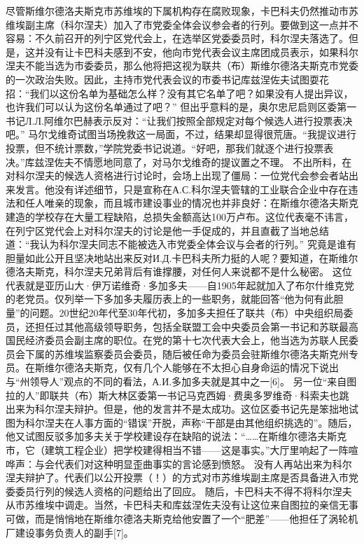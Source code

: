 尽管斯维尔德洛夫斯克市苏维埃的下属机构存在腐败现象，卡巴科夫仍然推动市苏维埃副主席（科尔涅夫）加入了市党委全体会议参会者的行列。要做到这一点并不容易：不久前召开的列宁区党代会上，在选举区党委委员时，科尔涅夫落选了。但是，这并没有让卡巴科夫感到不安，他向市党代表会议主席团成员表示，如果科尔涅夫不能当选为市委委员，那么他将把这视为联共（布）斯维尔德洛夫斯克市党委的一次政治失败。因此，主持市党代表会议的市委书记库兹涅佐夫试图耍花招：“我们以这份名单为基础怎么样？没有其它名单了吧？如果没有人提出异议，也许我们可以认为这份名单通过了吧？”
但出乎意料的是，奥尔忠尼启则区委第一书记Л.Л.阿维尔巴赫表示反对：“让我们按照全部规定对每个候选人进行投票表决吧。”
马尔戈维奇试图当场挽救这一局面，不过，结果却显得很荒唐。“我提议进行投票，但不统计票数，”学院党委书记说道。“好吧，那我们就逐个进行投票表决。”库兹涅佐夫不情愿地同意了，对马尔戈维奇的提议置之不理。
不出所料，在对科尔涅夫的候选人资格进行讨论时，会场上出现了僵局：一位党代会参会者站出来发言。他没有详述细节，只是宣称在А.С.科尔涅夫管辖的工业联合企业中存在违法和任人唯亲的现象，而且城市建设事业的情况也并非良好：在斯维尔德洛夫斯克建造的学校存在大量工程缺陷，总损失金额高达100万卢布。这位代表毫不讳言，在列宁区党代会上对科尔涅夫的讨论是他一手促成的，并且直截了当地总结道：“我认为科尔涅夫同志不能被选入市党委全体会议与会者的行列。”
究竟是谁有胆量如此公开且坚决地站出来反对И.Д.卡巴科夫所力挺的人呢？要知道，在斯维尔德洛夫斯克，科尔涅夫兄弟背后有谁撑腰，对任何人来说都不是什么秘密。
这位代表就是亚历山大·伊万诺维奇·多加多夫——自1905年起就加入了布尔什维克党的老党员。仅列举一下多加多夫履历表上的一些职务，就能回答“他为何有此胆量”的问题。20世纪20年代至30年代初，多加多夫担任了联共（布）中央组织局委员，还担任过其他高级领导职务，包括全联盟工会中央委员会第一书记和苏联最高国民经济委员会副主席的职位。在党的第十七次代表大会上，他当选为苏联人民委员会下属的苏维埃监察委员会委员，随后被任命为委员会驻斯维尔德洛夫斯克州专员。在斯维尔德洛夫斯克，仅有几个人能够在不太担心自身命运的情况下说出与“州领导人”观点的不同的看法，А.И.多加多夫就是其中之一[6]。
另一位“来自图拉的人”即联共（布）斯大林区委第一书记马克西姆·费奥多罗维奇·科索夫也跳出来为科尔涅夫辩护。但是，他的发言并不是太成功。这位区委书记先是笨拙地试图为科尔涅夫在人事方面的“错误”开脱，声称“干部是由其他组织挑选的”。随后，他又试图反驳多加多夫关于学校建设存在缺陷的说法：“……在斯维尔德洛夫斯克市，它（建筑工程企业）把学校建得相当不错——这是事实。”大厅里响起了一阵喧哗声：与会代表们对这种明显歪曲事实的言论感到愤怒。
没有人再站出来为科尔涅夫辩护了。代表们以公开投票（！）的方式对市苏维埃副主席是否具备进入市党委委员行列的候选人资格的问题给出了回应。
随后，卡巴科夫不得不将科尔涅夫从市苏维埃中调走。当然，卡巴科夫和库兹涅佐夫没有让这位来自图拉的亲信无事可做，而是悄悄地在斯维尔德洛夫斯克给他安置了一个“肥差”——他担任了涡轮机厂建设事务负责人的副手[7]。

